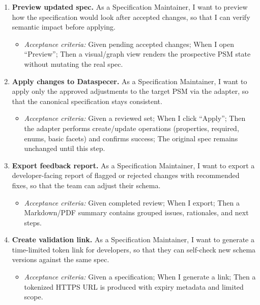 \begin{enumerate}
  \item \textbf{Preview updated spec.} As a Specification Maintainer, I want to preview how the specification would look after accepted changes, so that I can verify semantic impact before applying. 
  \begin{itemize}
    \item \emph{Acceptance criteria:} Given pending accepted changes; When I open “Preview”; Then a visual/graph view renders the prospective PSM state without mutating the real spec.
  \end{itemize}

  \item \textbf{Apply changes to Dataspecer.} As a Specification Maintainer, I want to apply only the approved adjustments to the target PSM via the adapter, so that the canonical specification stays consistent.
  \begin{itemize}
    \item \emph{Acceptance criteria:} Given a reviewed set; When I click “Apply”; Then the adapter performs create/update operations (properties, required, enums, basic facets) and confirms success; The original spec remains unchanged until this step.
  \end{itemize}

  \item \textbf{Export feedback report.} As a Specification Maintainer, I want to export a developer-facing report of flagged or rejected changes with recommended fixes, so that the team can adjust their schema.
  \begin{itemize}
    \item \emph{Acceptance criteria:} Given completed review; When I export; Then a Markdown/PDF summary contains grouped issues, rationales, and next steps.
  \end{itemize}

  \item \textbf{Create validation link.} As a Specification Maintainer, I want to generate a time-limited token link for developers, so that they can self-check new schema versions against the same spec. 
  \begin{itemize}
    \item \emph{Acceptance criteria:} Given a specification; When I generate a link; Then a tokenized HTTPS URL is produced with expiry metadata and limited scope.
  \end{itemize}
\end{enumerate}


